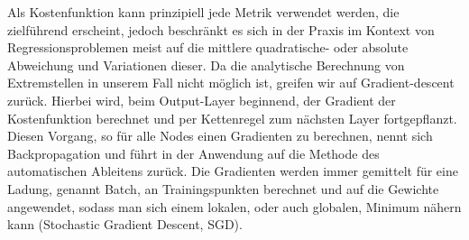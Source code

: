 Als Kostenfunktion kann prinzipiell jede Metrik verwendet werden, die zielführend erscheint, jedoch beschränkt es sich in der Praxis im Kontext von Regressionsproblemen meist auf die mittlere quadratische- oder absolute Abweichung und Variationen dieser.
Da die analytische Berechnung von Extremstellen in unserem Fall nicht möglich ist, greifen wir auf \glqq Gradient-descent\grqq~ zurück. Hierbei wird, beim Output-Layer beginnend, der Gradient der Kostenfunktion berechnet und per Kettenregel zum nächsten Layer fortgepflanzt. Diesen Vorgang, so für alle Nodes einen Gradienten zu berechnen, nennt sich Backpropagation und führt in der Anwendung auf die Methode des automatischen Ableitens zurück. Die Gradienten werden immer gemittelt für eine Ladung, genannt Batch, an Trainingspunkten berechnet und auf die Gewichte angewendet, sodass man sich einem lokalen, oder auch globalen, Minimum nähern kann (Stochastic Gradient Descent, SGD).
